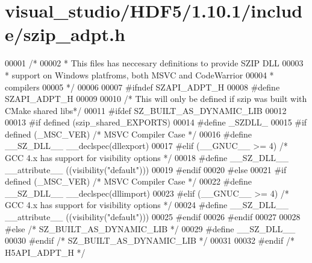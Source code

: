 \hypertarget{visual__studio_2_h_d_f5_21_810_81_2include_2szip__adpt_8h_source}{}\section{visual\+\_\+studio/\+H\+D\+F5/1.10.1/include/szip\+\_\+adpt.h}
\label{visual__studio_2_h_d_f5_21_810_81_2include_2szip__adpt_8h_source}

\begin{DoxyCode}
00001 \textcolor{comment}{/*}
00002 \textcolor{comment}{ * This files has neccesary definitions to provide SZIP DLL }
00003 \textcolor{comment}{ * support on Windows platfroms, both MSVC and CodeWarrior }
00004 \textcolor{comment}{ * compilers}
00005 \textcolor{comment}{ */}
00006 
00007 \textcolor{preprocessor}{#ifndef SZAPI\_ADPT\_H}
00008 \textcolor{preprocessor}{#define SZAPI\_ADPT\_H}
00009 
00010 \textcolor{comment}{/* This will only be defined if szip was built with CMake shared libs*/}
00011 \textcolor{preprocessor}{#ifdef SZ\_BUILT\_AS\_DYNAMIC\_LIB}
00012 
00013 \textcolor{preprocessor}{#if defined (szip\_shared\_EXPORTS)}
00014 \textcolor{preprocessor}{  #define \_SZDLL\_}
00015 \textcolor{preprocessor}{  #if defined (\_MSC\_VER)  }\textcolor{comment}{/* MSVC Compiler Case */}\textcolor{preprocessor}{}
00016 \textcolor{preprocessor}{    #define \_\_SZ\_DLL\_\_ \_\_declspec(dllexport)}
00017 \textcolor{preprocessor}{  #elif (\_\_GNUC\_\_ >= 4)  }\textcolor{comment}{/* GCC 4.x has support for visibility options */}\textcolor{preprocessor}{}
00018 \textcolor{preprocessor}{    #define \_\_SZ\_DLL\_\_ \_\_attribute\_\_ ((visibility("default")))}
00019 \textcolor{preprocessor}{  #endif}
00020 \textcolor{preprocessor}{#else}
00021 \textcolor{preprocessor}{  #if defined (\_MSC\_VER)  }\textcolor{comment}{/* MSVC Compiler Case */}\textcolor{preprocessor}{}
00022 \textcolor{preprocessor}{    #define \_\_SZ\_DLL\_\_ \_\_declspec(dllimport)}
00023 \textcolor{preprocessor}{  #elif (\_\_GNUC\_\_ >= 4)  }\textcolor{comment}{/* GCC 4.x has support for visibility options */}\textcolor{preprocessor}{}
00024 \textcolor{preprocessor}{    #define \_\_SZ\_DLL\_\_ \_\_attribute\_\_ ((visibility("default")))}
00025 \textcolor{preprocessor}{  #endif}
00026 \textcolor{preprocessor}{#endif}
00027 
00028 \textcolor{preprocessor}{#else }\textcolor{comment}{/* SZ\_BUILT\_AS\_DYNAMIC\_LIB */}\textcolor{preprocessor}{}
00029 \textcolor{preprocessor}{  #define \_\_SZ\_DLL\_\_}
00030 \textcolor{preprocessor}{#endif }\textcolor{comment}{/* SZ\_BUILT\_AS\_DYNAMIC\_LIB */}\textcolor{preprocessor}{}
00031 
00032 \textcolor{preprocessor}{#endif }\textcolor{comment}{/* H5API\_ADPT\_H */}\textcolor{preprocessor}{}
\end{DoxyCode}
